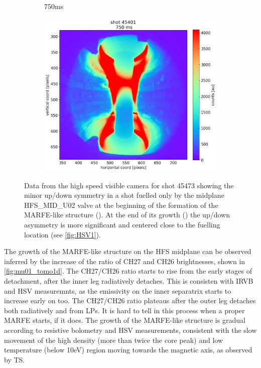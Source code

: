 \begin{figure}[!ht]
\begin{subfigure}{0.3\linewidth}
         \caption{750ms}
         \label{fig:mu01_tomo4b}
    \end{subfigure}
    \begin{subfigure}{0.054\linewidth}
         \centering
         \vspace{-6mm}
         \includegraphics[trim={595 0 0 50},clip,width=\textwidth]{Chapters/chapter2/figs/45473_for_paper_750ms.png}
    \end{subfigure}
    \caption{Data from the high speed visible camera for shot 45473 showing the minor up/down symmetry in a shot fuelled only by the midplane HFS\_MID\_U02 valve at the beginning of the formation of the MARFE-like structure (). At the end of its growth () the up/down asymmetry is more significant and centered close to the fuelling location (see \autoref{fig:HSV1}).}
    \label{fig:mu01_tomo4}
\end{figure}

The growth of the MARFE-like structure on the HFS midplane can be observed inferred by the increase of the ratio of CH27 and CH26 brightnesses, shown in \autoref{fig:mu01_tomo1d}. The CH27/CH26 ratio starts to rise from the early stages of detachment, after the inner leg radiatively detaches. This is consisten with IRVB and HSV measuremnts, as the emissivity on the inner separatrix starts to increase early on too. The CH27/CH26 ratio plateaus after the outer leg detaches both radiatively and from LPs. It is hard to tell in this process when a proper MARFE starts, if it does. The growth of the MARFE-like structure is gradual according to resistive bolometry and HSV measurements, consistent with the slow movement of the high density (more than twice the core peak) and low temperature (below 10eV) region moving towards the magnetic axis, as observed by TS.

